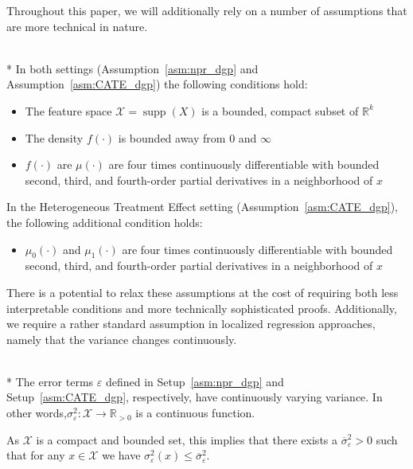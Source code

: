 Throughout this paper, we will additionally rely on a number of assumptions that are more technical in nature.
\begin{boxD}
	\begin{asm}\label{asm:technical}\mbox{}\\*
		In both settings (Assumption~\ref{asm:npr_dgp} and Assumption~\ref{asm:CATE_dgp}) the following conditions hold:
		\begin{itemize}
			\item The feature space $\mathcal{X} = \operatorname{supp}(X)$ is a bounded, compact subset of $\mathbb{R}^k$
			\item The density $f(\cdot)$ is bounded away from 0 and $\infty$
			\item $f(\cdot)$ are $\mu(\cdot)$ are four times continuously differentiable with bounded second, third, and fourth-order partial derivatives in a neighborhood of $x$
		\end{itemize}
		In the Heterogeneous Treatment Effect setting (Assumption~\ref{asm:CATE_dgp}), the following additional condition holds:
		\begin{itemize}
			\item $\mu_0(\cdot)$ and $\mu_1(\cdot)$ are four times continuously differentiable with bounded second, third, and fourth-order partial derivatives in a neighborhood of $x$
		\end{itemize}
	\end{asm}
\end{boxD}
There is a potential to relax these assumptions at the cost of requiring both less interpretable conditions and more technically sophisticated proofs.
Additionally, we require a rather standard assumption in localized regression approaches, namely that the variance changes continuously.
\begin{boxD}
	\begin{asm}\label{asm:errors}\mbox{}\\*
		The error terms $\varepsilon$ defined in Setup~\ref{asm:npr_dgp} and Setup~\ref{asm:CATE_dgp}, respectively, have continuously varying variance.
		In other words,$\sigma^2_{\varepsilon}: \mathcal{X} \rightarrow \mathbb{R}_{>0}$ is a continuous function.
	\end{asm}
\end{boxD}
As $\mathcal{X}$ is a compact and bounded set, this implies that there exists a $\overline{\sigma}_{\varepsilon}^2 > 0$ such that for any $x \in \mathcal{X}$ we have $\sigma^{2}_{\varepsilon}\left(x\right) \leq \overline{\sigma}_{\varepsilon}^2$.
